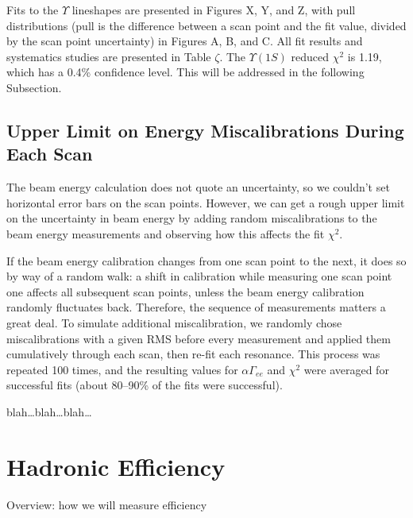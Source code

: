 \documentclass[aps,prd,preprint,superscriptaddress,tightenlines,nofootinbib,floatfix]{revtex4}
\begin{document}
Fits to the $\Upsilon$ lineshapes are presented in Figures X, Y, and
Z, with pull distributions (pull is the difference between a scan
point and the fit value, divided by the scan point uncertainty) in
Figures A, B, and C.  All fit results and systematics studies are
presented in Table $\zeta$.  The $\Upsilon(1S)$ reduced $\chi^2$ is
1.19, which has a 0.4\% confidence level.  This will be addressed in
the following Subsection.

%
\subsection{Upper Limit on Energy Miscalibrations During Each Scan}
%

The beam energy calculation does not quote an uncertainty, so we
couldn't set horizontal error bars on the scan points.  However, we
can get a rough upper limit on the uncertainty in beam energy by
adding random miscalibrations to the beam energy measurements and
observing how this affects the fit $\chi^2$.

If the beam energy calibration changes from one scan point to the
next, it does so by way of a random walk: a shift in calibration while
measuring one scan point one affects all subsequent scan points,
unless the beam energy calibration randomly fluctuates back.
Therefore, the sequence of measurements matters a great deal.  To
simulate additional miscalibration, we randomly chose miscalibrations
with a given RMS before every measurement and applied them
cumulatively through each scan, then re-fit each resonance.  This
process was repeated 100 times, and the resulting values for
$\alpha\Gamma_{ee}$ and $\chi^2$ were averaged for successful fits
(about 80--90\% of the fits were successful).

blah\ldots blah\ldots blah\ldots



%
\section{Hadronic Efficiency}
%

Overview: how we will measure efficiency

%
\end{document}
